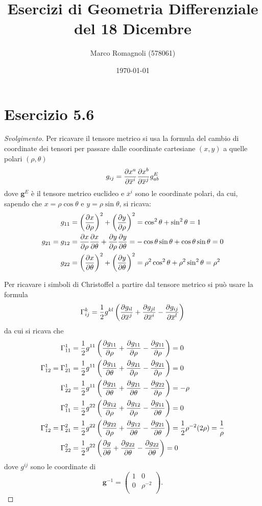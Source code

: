 \documentclass[italian,a4paper,10pt]{article}
\title{Esercizi di Geometria Differenziale\\ del 18 Dicembre}
\author{Marco Romagnoli (578061)}
\date{\today}
\begin{document}
\maketitle

\section*{Esercizio 5.6}
\begin{proof}[Svolgimento]
Per ricavare il tensore metrico si usa la formula del cambio di coordinate dei tensori per passare dalle coordinate cartesiane $(x,y)$ a quelle polari $(\rho,\theta)$ $$g_{ij} = \pdv{x^a}{\overline{x}^i} \pdv{x^b}{\overline{x}^j}g^E_{ab}$$ dove $\bm{g}^E$ è il tensore metrico euclideo e $\overline{x}^i$ sono le coordinate polari, da cui, sapendo che $x= \rho\cos{\theta}$ e $y= \rho\sin{\theta}$, si ricava:
\begin{align*}
g_{11} &= \left(\pdv{x}{\rho}\right)^2+\left(\pdv{y}{\rho}\right)^2 = \cos^2{\theta}+\sin^2{\theta} = 1\\
g_{21} = g_{12} &= \pdv{x}{\rho}\pdv{x}{\theta} + \pdv{y}{\rho}\pdv{y}{\theta} = -\cos{\theta}\sin{\theta} + \cos{\theta}\sin{\theta} = 0\\
g_{22} &= \left(\pdv{x}{\theta}\right)^2+\left(\pdv{y}{\theta}\right)^2 = \rho^2\cos^2{\theta}+\rho^2\sin^2{\theta} = \rho^2
\end{align*}

Per ricavare i simboli di Christoffel a partire dal tensore metrico si può usare la formula$$\Gamma^k_{ij} = \frac12 g^{kl}\left(\pdv{g_{il}}{\overline{x}^j}+\pdv{g_{jl}}{\overline{x}^i}-\pdv{g_{ij}}{\overline{x}^l}\right)$$ da cui si ricava che
\begin{align*}
\Gamma^1_{11} &= \frac12 g^{11}\left(\pdv{g_{11}}{\rho}+\pdv{g_{11}}{\rho}-\pdv{g_{11}}{\rho}\right)=0\\
\Gamma^1_{12}=\Gamma^1_{21} &= \frac12 g^{11}\left(\pdv{g_{11}}{\theta}+\pdv{g_{21}}{\rho}-\pdv{g_{21}}{\rho}\right)=0\\
\Gamma^1_{22} &= \frac12 g^{11}\left(\pdv{g_{21}}{\theta}+\pdv{g_{21}}{\theta}-\pdv{g_{22}}{\rho}\right)=-\rho\\
\Gamma^2_{11} &= \frac12 g^{22}\left(\pdv{g_{12}}{\rho}+\pdv{g_{12}}{\rho}-\pdv{g_{11}}{\theta}\right)=0\\
\Gamma^2_{12}=\Gamma^2_{21} &= \frac12 g^{22}\left(\pdv{g_{22}}{\rho}+\pdv{g_{12}}{\theta}-\pdv{g_{21}}{\theta}\right)= \frac12 \rho^{-2} (2\rho) = \frac{1}{\rho}\\
\Gamma^2_{22} &= \frac12 g^{22}\left(\pdv{g_{}}{\theta}+\pdv{g_{22}}{\theta}-\pdv{g_{22}}{\theta}\right)=0
\end{align*} 
dove $g^{ij}$ sono le coordinate di 
\begin{equation*}
\bm{g}^{-1}= \begin{pmatrix}
1 & 0\\
0 & \rho^{-2}\\
\end{pmatrix}.
\end{equation*}


\end{proof}
\end{document}
